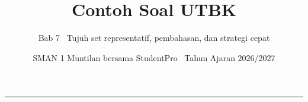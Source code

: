 \renewcommand{\currentchapter}{7}
\title{Contoh Soal UTBK}
\subtitle{Bab 7 \textbar\ Tujuh set representatif, pembahasan, dan strategi cepat}
\date{SMAN 1 Muntilan bersama StudentPro \textbar\ Tahun Ajaran 2026/2027}

\newcommand{\examplemeta}[3]{%
  {\color{StudentBlue}\bfseries\fontsize{10.4}{12.8}\selectfont #1}%
  {\color{StudentGray}\fontsize{10.2}{12.8}\selectfont\enspace\textbar\enspace #2\enspace\textbar\enspace #3}\par\vspace{0.10cm}%
}
\newcommand{\mistake}[1]{%
  {\color{StudentRed}\bfseries Kesalahan umum:}\enspace #1%
}
\newcommand{\quick}[1]{%
  {\color{StudentBlue}\bfseries Strategi cepat:}\enspace #1%
}

\begingroup
{}
\begin{frame}[plain]
  \vspace{0.65cm}
  \vspace{0.08cm}
  {\color{StudentWhite}\inserttitle\par}
  \vspace{0.38cm}
  {\color{StudentSoft}\insertsubtitle\par}
  \vfill
  {\color{StudentGold}\rule{2.3cm}{2.5pt}}\par
  \vspace{0.20cm}
  {\color{StudentWhite}\insertauthor}\par
  {\color{StudentSoft}\insertdate}
  \vspace{0.42cm}
\end{frame}
\endgroup

